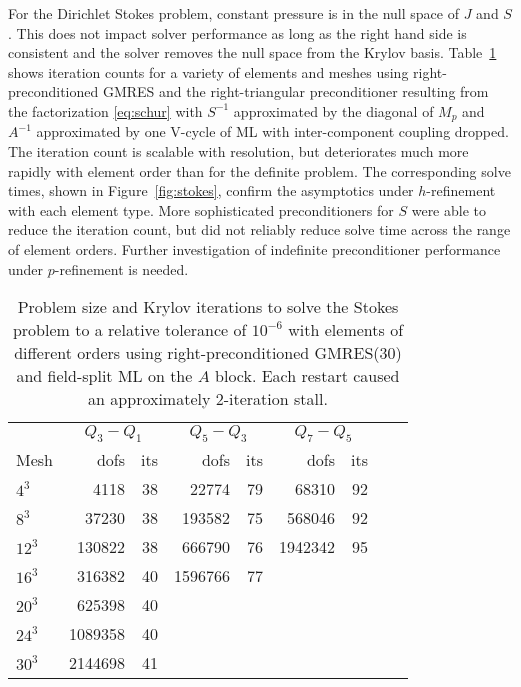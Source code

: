 For the Dirichlet Stokes problem, constant pressure is in the null space of $J$ and $S$.  This does not impact solver
performance as long as the right hand side is consistent and the solver removes the null space from the Krylov basis.
Table~\ref{tab:stokes} shows iteration counts for a variety of elements and meshes using right-preconditioned GMRES and
the right-triangular preconditioner resulting from the factorization \eqref{eq:schur} with $S^{-1}$ approximated by the
diagonal of $M_p$ and $A^{-1}$ approximated by one V-cycle of ML with inter-component coupling dropped.  The iteration
count is scalable with resolution, but deteriorates much more rapidly with element order than for the definite problem.
The corresponding solve times, shown in Figure~\ref{fig:stokes}, confirm the asymptotics under $h$-refinement with each
element type.  More sophisticated preconditioners for $S$ were able to reduce the iteration count, but did not reliably
reduce solve time across the range of element orders.  Further investigation of indefinite preconditioner performance
under $p$-refinement is needed.

\begin{table}
  \centering
  \begin{tabular}{l rr rr rr rr}
    \toprule
     & \multicolumn{2}{c}{$Q_3-Q_1$} & \multicolumn{2}{c}{$Q_5-Q_3$} & \multicolumn{2}{c}{$Q_7-Q_5$} \\
     \cmidrule(r){2-3} \cmidrule(lr){4-5} \cmidrule(l){6-7}
     Mesh & dofs & its & dofs & its & dofs & its \\
     \midrule
    $4^3$ &  4118 & 38    &    22774 &   79 &        68310 &   92 \\ 
    $8^3$ &  37230 & 38   &   193582 &   75 &       568046 &   92 \\ 
    $12^3$ & 130822 & 38  &   666790 &   76 &      1942342 &   95 \\
    $16^3$ & 316382 & 40  &  1596766 &   77 &              &      \\
    $20^3$ & 625398 & 40  &          &      &              &      \\
    $24^3$ & 1089358 & 40 &          &      &              &      \\
    $30^3$ & 2144698 & 41 &          &      &              &      \\
    \bottomrule
  \end{tabular}
  \caption{Problem size and Krylov iterations to solve the Stokes problem to a relative tolerance of $10^{-6}$ with
    elements of different orders using right-preconditioned GMRES(30) and field-split ML on the $A$ block.  Each restart
    caused an approximately 2-iteration stall.}
  \label{tab:stokes}
\end{table}

